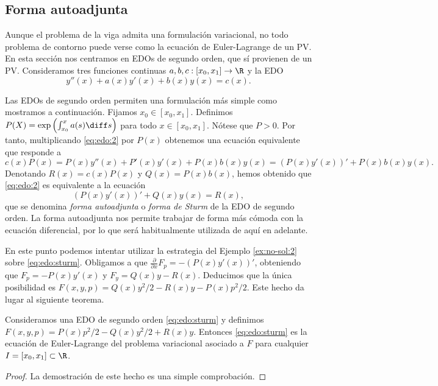 \documentclass{article}
\begin{document}
\subsection{Forma autoadjunta}

Aunque el problema de la viga admita una formulación variacional, no todo problema de contorno puede
verse como la ecuación de Euler-Lagrange de un PV. En esta sección nos centramos en EDOs de segundo
orden, que sí provienen de un PV. Consideramos tres funciones continuas
$a, b, c : [x_0, x_1] \to \R$ y la EDO
\begin{equation} \label{eq:edo:2}

  y''(x) + a(x) y'(x) + b(x)y(x) = c(x).  \tag{E2}
\end{equation}

Las EDOs de segundo orden permiten una formulación más simple como mostramos a continuación. Fijamos
$x_0 \in [x_0, x_1]$. Definimos $P(X) = \exp\left(\int^x_{x_0} a(s) \diff s\right)$ para todo
$x \in [x_0, x_1]$. Nótese que $P > 0$. Por tanto, multiplicando \eqref{eq:edo:2} por $P(x)$
obtenemos una ecuación equivalente que responde a
\[c(x) P(x) = P(x)y''(x) + P'(x)y'(x) + P(x) b(x) y(x) = \left(P(x)y'(x)\right)' + P(x) b(x) y(x).\]
Denotando $R(x) = c(x) P(x)$ y $Q(x) = P(x) b(x)$, hemos obtenido que \eqref{eq:edo:2} es
equivalente a la ecuación
\begin{equation}
  \label{eq:edo:sturm}
  \left(P(x)y'(x)\right)' + Q(x) y(x) = R(x),
  \tag{S}
\end{equation}
que se denomina \emph{forma autoadjunta} o \emph{forma de Sturm} de la EDO de segundo orden. La
forma autoadjunta nos permite trabajar de forma más cómoda con la ecuación diferencial, por lo que
será habitualmente utilizada de aquí en adelante.

En este punto podemos intentar utilizar la estrategia del Ejemplo \ref{ex:no-sol:2} sobre
\eqref{eq:edo:sturm}. Obligamos a que $\frac{\partial}{\partial x} F_p = - \left(P(x)y'(x)\right)'$,
obteniendo que $F_p = -P(x)y'(x)$ y $F_y = Q(x)y-R(x)$. Deducimos que la única posibilidad es
$F(x,y,p) = Q(x)y^2/2 - R(x)y - P(x) p^2/2$. Este hecho da lugar al siguiente teorema.

\begin{thm} \label{thm:pv:sturm} Consideramos una EDO de segundo orden \eqref{eq:edo:sturm} y
  definimos $F(x,y,p) = P(x) p^2/2 - Q(x) y^2/2 + R(x)y$. Entonces \eqref{eq:edo:sturm} es la
  ecuación de Euler-Lagrange del problema variacional asociado a $F$ para cualquier
  $I = [x_0, x_1] \subset \R$.
\end{thm}
\begin{proof}
  La demostración de este hecho es una simple comprobación.
\end{proof}
\end{document}
